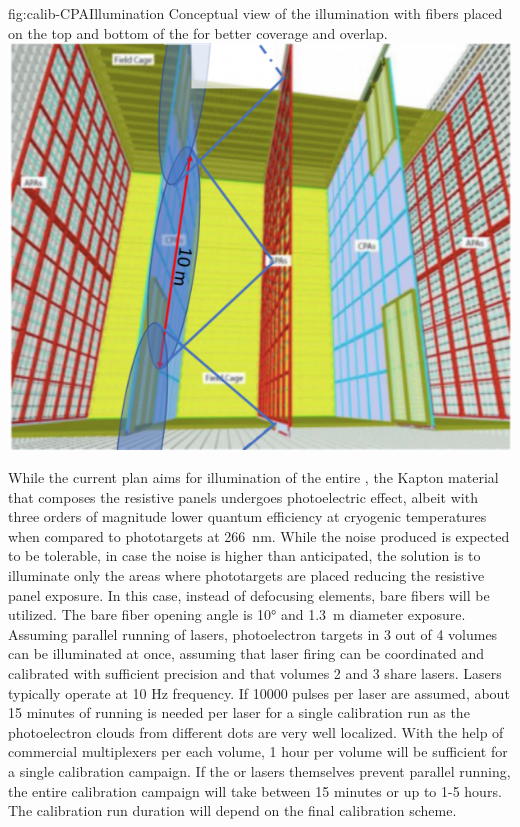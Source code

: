 \begin{dunefigure}{fig:calib-CPAIllumination}
{Conceptual view of the  illumination with fibers placed on the top and bottom of the  for better coverage and overlap.} 
\includegraphics[width=0.55\linewidth]{graphics/calib-CPAIllumination.png} 
\end{dunefigure}


While the current plan aims for illumination of the entire , the Kapton material that composes the resistive panels undergoes photoelectric effect, albeit with three orders of magnitude lower quantum efficiency at cryogenic temperatures when compared to phototargets at \SI{266}{\nano\m}. While the noise produced is expected to be tolerable, in case the noise is higher than anticipated, the solution is to illuminate only the areas where phototargets are placed reducing the resistive panel exposure. In this case, instead of defocusing elements, bare fibers will be utilized. The bare fiber opening angle is \ang{10} and \SI{1.3}{\m} diameter exposure.   
Assuming parallel running of lasers, photoelectron targets in 3 out of 4 volumes can be illuminated at once, assuming that laser firing can be coordinated and calibrated with sufficient precision and that volumes 2 and 3 share lasers. Lasers typically operate at 10 Hz frequency. If 10000 pulses per laser are assumed, about 15 minutes of running is needed per laser for a single calibration run
as the photoelectron clouds from different dots are very well localized.
With the help of commercial multiplexers per each volume, 1 hour per volume will be sufficient for a single calibration campaign. If the  or lasers themselves prevent parallel running, the entire calibration campaign will take between 15 minutes or up to 1-5 hours. The calibration run duration will depend on the final calibration scheme.

